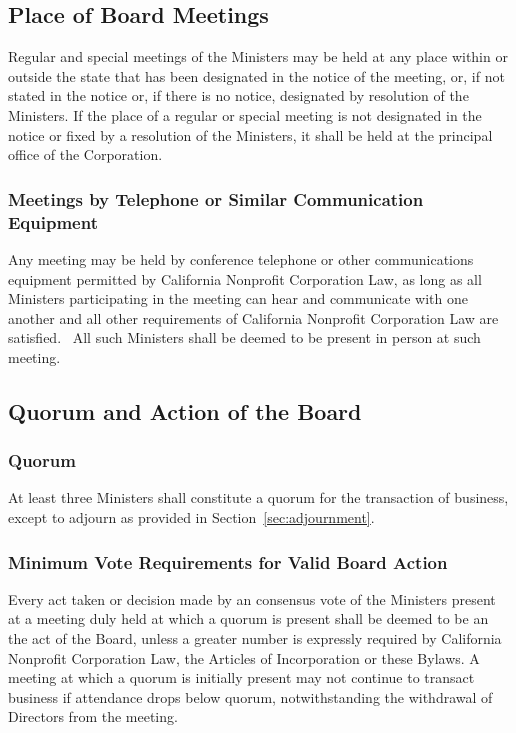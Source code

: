 \documentclass[letterpaper,titlepage]{article}
\begin{document}
\subsection{Place of Board Meetings}
\label{sec:placeMeetings}
Regular and special meetings of the Ministers may be held at any place within
or outside the state that has been designated in the notice of the meeting, or,
if not stated in the notice or, if there is no notice, designated by resolution
of the Ministers. If the place of a regular or special meeting is not
designated in the notice or fixed by a resolution of the Ministers, it shall be
held at the principal office of the Corporation.  
\subsubsection{Meetings by Telephone or Similar Communication Equipment}
\label{sec:meetingsTelephone}
Any meeting may be held by conference telephone or other communications
equipment permitted by California Nonprofit Corporation Law, as long as all
Ministers participating in the meeting can hear and communicate with one
another and all other requirements of California Nonprofit Corporation Law are
satisfied.  All such Ministers shall be deemed to be present in person at such
meeting.
\subsection{Quorum and Action of the Board}
\label{sec:quorumAction}
\subsubsection{Quorum}
\label{sec:quorum}
At least three Ministers shall constitute a quorum for the transaction of
business, except to adjourn as provided in Section~\ref{sec:adjournment}.
\subsubsection{Minimum Vote Requirements for Valid Board Action}
\label{sec:minimumVote}
Every act taken or decision made by an consensus vote of the Ministers present
at a meeting duly held at which a quorum is present shall be deemed to be an
the act of the Board, unless a greater number is expressly required by
California Nonprofit Corporation Law, the Articles of Incorporation or these
Bylaws. A meeting at which a quorum is initially present may not continue to
transact business if attendance drops below quorum, notwithstanding the
withdrawal of Directors from the meeting.
\end{document}
